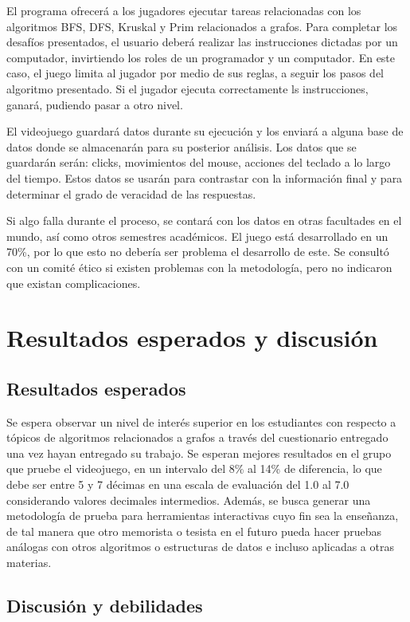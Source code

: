 \documentclass[submission]{eptcs}
\begin{document}
El programa ofrecerá a los jugadores ejecutar tareas relacionadas con los algoritmos BFS, DFS, Kruskal y Prim relacionados a grafos.
Para completar los desafíos presentados, el usuario deberá realizar las instrucciones dictadas por un computador, invirtiendo los roles
de un programador y un computador. En este caso, el juego limita al jugador por medio de sus reglas, a seguir los pasos del algoritmo 
presentado. Si el jugador ejecuta correctamente ls instrucciones, ganará, pudiendo pasar a otro nivel.

El videojuego guardará datos durante su ejecución y los enviará a alguna base de datos donde se almacenarán para su posterior
análisis. Los datos que se guardarán serán: clicks, movimientos del mouse, acciones del teclado a lo largo del tiempo.
Estos datos se usarán para contrastar con la información final y para determinar el grado de veracidad de las respuestas.


Si algo falla durante el proceso, se contará con los datos en otras facultades en el mundo, así como otros semestres académicos. El juego está
desarrollado en un 70\%, por lo que esto no debería ser problema el desarrollo de este. Se consultó con un comité ético si existen problemas con
la metodología, pero no indicaron que existan complicaciones.


\section{Resultados esperados y discusión}


\subsection{Resultados esperados}

Se espera observar un nivel de interés superior en los estudiantes con respecto a tópicos de algoritmos
relacionados a grafos a través del cuestionario entregado una vez hayan entregado su trabajo.
Se esperan mejores resultados en el grupo que pruebe el videojuego, en un intervalo del
8\% al 14\% de diferencia, lo que debe ser entre 5 y 7 décimas en una escala de evaluación del 1.0 al 7.0
considerando valores decimales intermedios.
Además, se busca generar una metodología de prueba para herramientas interactivas cuyo fin sea la enseñanza,
de tal manera que otro memorista o tesista en el futuro pueda hacer pruebas análogas con otros algoritmos
o estructuras de datos e incluso aplicadas a otras materias.

\subsection{Discusión y debilidades}
\end{document}
